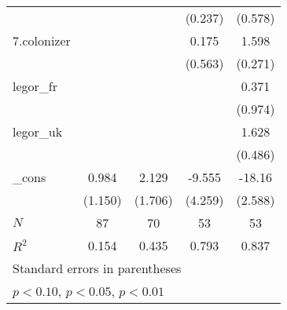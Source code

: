 {\begin{tabular}{l*{4}{c}}
            &                     &                     &     (0.237)         &     (0.578)         \\
[1em]
7.colonizer &                     &                     &       0.175         &       1.598\sym{***}\\
            &                     &                     &     (0.563)         &     (0.271)         \\
[1em]
legor\_fr    &                     &                     &                     &       0.371         \\
            &                     &                     &                     &     (0.974)         \\
[1em]
legor\_uk    &                     &                     &                     &       1.628\sym{**} \\
            &                     &                     &                     &     (0.486)         \\
[1em]
\_cons      &       0.984         &       2.129         &      -9.555\sym{*}  &      -18.16\sym{***}\\
            &     (1.150)         &     (1.706)         &     (4.259)         &     (2.588)         \\
\hline
\(N\)       &          87         &          70         &          53         &          53         \\
\(R^{2}\)   &       0.154         &       0.435         &       0.793         &       0.837         \\
\hline\hline
\multicolumn{5}{l}{\footnotesize Standard errors in parentheses}\\
\multicolumn{5}{l}{\footnotesize \sym{*} \(p<0.10\), \sym{**} \(p<0.05\), \sym{***} \(p<0.01\)}\\
\end{tabular}
}
